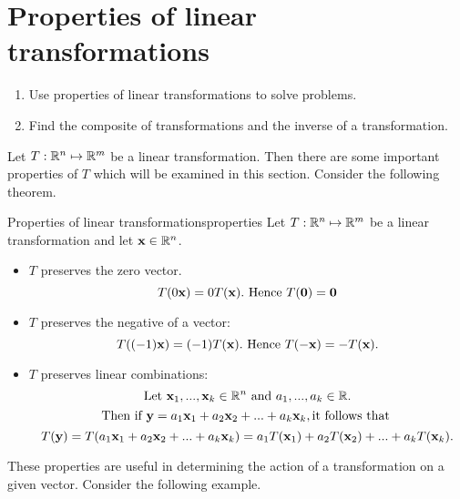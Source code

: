 \section{Properties of linear transformations}

\begin{outcome}
  \begin{enumerate}
  \item Use properties of linear transformations to solve problems.
  \item Find the composite of transformations and the inverse of a
    transformation.
  \end{enumerate}
\end{outcome}

Let $T: \mathbb{R}^n \mapsto \mathbb{R}^m$ be a linear transformation. Then there are some important properties of $T$ which will be examined in this section. 
Consider the following theorem.

\begin{theorem}{Properties of linear transformations}{properties}
Let $T: \mathbb{R}^n \mapsto \mathbb{R}^m$ be a linear transformation and let $\mbox{\bf x} \in \mathbb{R}^n$. 

\begin{itemize}
\item $T$ preserves the zero vector. 
\[
T(0\mbox{\bf x}) = 0 T(\mbox{\bf x}). \mbox{ Hence }T(\mbox{\bf 0}) = \mbox{\bf 0}
\]
\item $T$ preserves the negative of a vector:
\[
T( (-1)\mbox{\bf x})=(-1)T(\mbox{\bf x}). \mbox{ Hence }T(-\mbox{\bf x}) = -T(\mbox{\bf x}).
\]
\item $T$ preserves linear combinations:
\[
\mbox{Let }\mbox{\bf x}_1, ..., \mbox{\bf x}_k \in \mathbb{R}^n \mbox{ and }a_1, ..., a_k \in \mathbb{R}.
\]
\[
\mbox{Then if }\mbox{\bf y} = a_1\mbox{\bf x}_1 + a_2\mbox{\bf x}_2 + ...+a_k \mbox{\bf x}_k, \mbox{it follows that }
\]
\[
T(\mbox{\bf y}) = T(a_1\mbox{\bf x}_1 + a_2\mbox{\bf x}_2 + ...+a_k \mbox{\bf x}_k) = a_1T(\mbox{\bf x}_1) + a_2T(\mbox{\bf x}_2) + ...+a_k T(\mbox{\bf x}_k).
\] 
\end{itemize}
\end{theorem}

These properties are useful in determining the action of a transformation on a given vector. Consider the following example.

